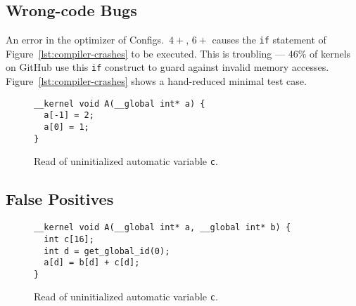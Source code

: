 

\subsection{Wrong-code Bugs}

An error in the optimizer of Configs.\ $4+$, $6+$ causes the \texttt{if} statement of Figure~\ref{lst:compiler-crashes} to be executed.
This is troubling --- 46\% of kernels on GitHub use this \texttt{if} construct to guard against invalid memory accesses. Figure~\ref{lst:compiler-crashes} shows a hand-reduced minimal test case.




\begin{figure}
\begin{lstlisting}
__kernel void A(__global int* a) {
  a[-1] = 2;
  a[0] = 1;
}
\end{lstlisting}
\caption{Read of uninitialized automatic variable \texttt{c}.}
\label{lst:uninit-read}
\end{figure}


\subsection{False Positives}

\begin{figure}
\begin{lstlisting}
__kernel void A(__global int* a, __global int* b) {
  int c[16];
  int d = get_global_id(0);
  a[d] = b[d] + c[d];
}
\end{lstlisting}
\caption{Read of uninitialized automatic variable \texttt{c}.}
\label{lst:uninit-read}
\end{figure}
